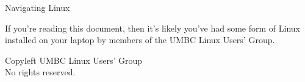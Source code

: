 \documentclass[11pt,draft]{article}
\begin{document}
\begin{multicols*}{3}

\begin{center} \LARGE
    Navigating Linux
\end{center}

\vspace{2em}

If you're reading this document, then it's likely you've had some form of Linux
installed on your laptop by members of the UMBC Linux Users' Group.


\vfill
\phantom{}
\columnbreak{}
\phantom{}

\columnbreak{}
\phantom{}

\columnbreak{}
\phantom{}

\vfill

\begin{center} \small 
    \textcopyleft{} Copyleft \the\year{} UMBC Linux Users' Group \\
    No rights reserved.
\end{center}

\end{multicols*}
\end{document}
